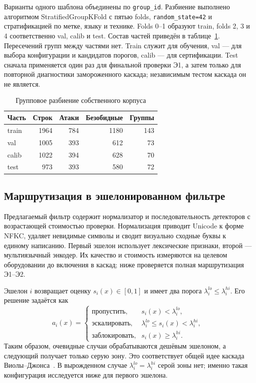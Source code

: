 \documentclass{misisarticle}
\begin{document}
Варианты одного шаблона объединены по \texttt{group\_id}. Разбиение выполнено алгоритмом StratifiedGroupKFold с пятью folds, \texttt{random\_state=42} и стратификацией по метке, языку и технике. Folds 0--1 образуют train, folds 2, 3 и 4 соответственно val, calib и test. Состав частей приведён в таблице~\ref{tab:split}. Пересечений групп между частями нет. Train служит для обучения, val --- для выбора конфигурации и кандидатов порогов, calib --- для сертификации. Test сначала применяется один раз для финальной проверки Э1, а затем только для повторной диагностики замороженного каскада; независимым тестом каскада он не является.

\begin{table}[t]
  \caption{Групповое разбиение собственного корпуса}
  \label{tab:split}
  \centering
  \begin{tabular}{lrrrr}
    \toprule
    Часть & Строк & Атаки & Безобидные & Группы \\
    \midrule
    train & 1964 & 784 & 1180 & 143 \\
    val & 1005 & 393 & 612 & 73 \\
    calib & 1022 & 394 & 628 & 70 \\
    test & 973 & 393 & 580 & 72 \\
    \bottomrule
  \end{tabular}
\end{table}

\subsection{Маршрутизация в эшелонированном фильтре}

Предлагаемый фильтр содержит нормализатор и последовательность детекторов с возрастающей стоимостью проверки. Нормализация приводит Unicode к форме NFKC, удаляет невидимые символы и сводит визуально сходные буквы к единому написанию. Первый эшелон использует лексические признаки, второй --- мультиязычный энкодер. Их качество и стоимость измеряются на целевом оборудовании до включения в каскад; ниже проверяется полная маршрутизация Э1--Э2.

Эшелон $i$ возвращает оценку $s_i(x)\in[0,1]$ и имеет два порога $\lambda_i^{lo}\leq\lambda_i^{hi}$. Его решение задаётся как
\begin{equation}
a_i(x)=
\begin{cases}
\text{пропустить}, & s_i(x)<\lambda_i^{lo},\\
\text{эскалировать}, & \lambda_i^{lo}\leq s_i(x)<\lambda_i^{hi},\\
\text{заблокировать}, & s_i(x)\geq\lambda_i^{hi}.
\end{cases}
\label{eq:routing}
\end{equation}
Таким образом, очевидные случаи обрабатываются дешёвым эшелоном, а следующий получает только серую зону. Это соответствует общей идее каскада Виолы--Джонса~\cite{viola2001}. В вырожденном случае $\lambda_i^{lo}=\lambda_i^{hi}$ серой зоны нет; именно такая конфигурация исследуется ниже для первого эшелона.
\end{document}
